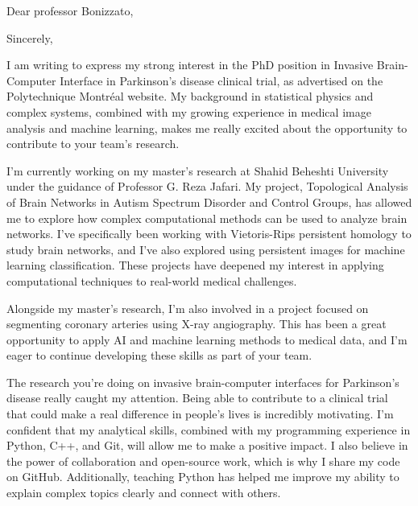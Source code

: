\documentclass[11pt,letterpaper,sans]{moderncv}
\date{\today}
\begin{document}
\opening{Dear professor Bonizzato,}
\closing{Sincerely,}



\makelettertitle

\justifying

I am writing to express my strong interest in the PhD position in Invasive Brain-Computer Interface in Parkinson's disease clinical trial, as advertised on the Polytechnique Montréal website.
My background in statistical physics and complex systems, combined with my growing experience in medical image analysis and machine learning, makes me really excited about the opportunity to contribute to your team’s research.

I’m currently working on my master’s research at Shahid Beheshti University under the guidance of Professor G. Reza Jafari. My project, Topological Analysis of Brain Networks in Autism Spectrum Disorder and Control Groups, has allowed me to explore how complex computational methods can be used to analyze brain networks.  I’ve specifically been working with Vietoris-Rips persistent homology to study brain networks, and I’ve also explored using persistent images for machine learning classification. These projects have deepened my interest in applying computational techniques to real-world medical challenges.

Alongside my master’s research, I’m also involved in a project focused on segmenting coronary arteries using X-ray angiography. This has been a great opportunity to apply AI and machine learning methods to medical data, and I’m eager to continue developing these skills as part of your team.


The research you’re doing on invasive brain-computer interfaces for Parkinson’s disease really caught my attention. Being able to contribute to a clinical trial that could make a real difference in people’s lives is incredibly motivating. I’m confident that my analytical skills, combined with my programming experience in Python, C++, and Git, will allow me to make a positive impact. I also believe in the power of collaboration and open-source work, which is why I share my code on GitHub. Additionally, teaching Python has helped me improve my ability to explain complex topics clearly and connect with others.
\end{document}
